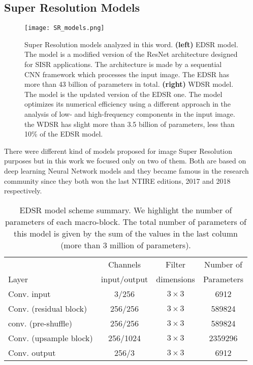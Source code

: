 \documentclass{standalone}
\begin{document}
\subsection[Super Resolution Models]{Super Resolution Models}\label{SR:wdsr}

\begin{center}
\begin{figure}[htbp]
\centering
\texttt{[image: SR\_models.png]}
\caption{Super Resolution models analyzed in this word.
\textbf{(left)} EDSR model.
The model is a modified version of the ResNet architecture designed for SISR applications.
The architecture is made by a sequential CNN framework which processes the input image.
The EDSR has more than 43 billion of parameters in total.
\textbf{(right)} WDSR model.
The model is the updated version of the EDSR one.
The model optimizes its numerical efficiency using a different approach in the analysis of low- and high-frequency components in the input image.
the WDSR has slight more than 3.5 billion of parameters, less than 10\% of the EDSR model.
}
\label{fig:sr_models}
\end{figure}
\end{center}

There were different kind of models proposed for image Super Resolution purposes but in this work we focused only on two of them.
Both are based on deep learning Neural Network models and they became famous in the research community since they both won the last NTIRE editions, 2017 and 2018 respectively.

\begin{table}[htbp]
\centering
\begin{tabular}{lccc}
\hline \rowcolor{darkgrayrow}
                         &  Channels     & Filter     & Number of    \\
\rowcolor{darkgrayrow}
Layer                    & input/output  & dimensions & Parameters   \\
\hline
Conv. input              & 3/256      & $3\times3$   & 6912    \\
Conv. (residual block)   & 256/256    & $3\times3$   & 589824  \\
conv. (pre-shuffle)      & 256/256    & $3\times3$   & 589824  \\
Conv. (upsample block)   & 256/1024   & $3\times3$   & 2359296 \\
Conv. output             & 256/3      & $3\times3$   & 6912    \\
\hline
\end{tabular}
\caption{EDSR model scheme summary.
We highlight the number of parameters of each macro-block.
The total number of parameters of this model is given by the sum of the values in the last column (more than 3 million of parameters).
}
\label{tab:edsr}
\end{table}
\end{document}
